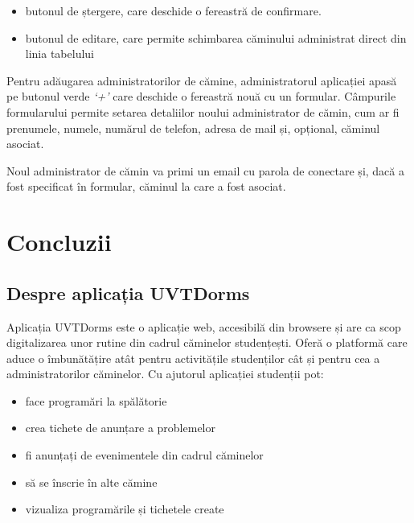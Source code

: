 \documentclass[12pt,a4paper]{report}
\theoremstyle{definition}
\theoremstyle{remark}
\begin{document}
\begin{itemize}
    \item butonul de ștergere, care deschide o fereastră de confirmare.
    \item butonul de editare, care permite schimbarea căminului administrat direct din linia tabelului
\end{itemize}


\par Pentru adăugarea administratorilor de cămine, administratorul aplicației apasă pe butonul verde \textit{`+'} care deschide o fereastră nouă cu un formular. Câmpurile formularului permite setarea detaliilor noului administrator de cămin, cum ar fi prenumele, numele, numărul de telefon, adresa de mail și, opțional, căminul asociat.

\par Noul administrator de cămin va primi un email cu parola de conectare și, dacă a fost specificat în formular, căminul la care a fost asociat.


\chapter{Concluzii}

\section{Despre aplicația UVTDorms}

\par Aplicația UVTDorms este o aplicație web, accesibilă din browsere și are ca scop digitalizarea unor rutine din cadrul căminelor studențești. Oferă o platformă care aduce o îmbunătățire atât pentru activitățile studenților cât și pentru cea a administratorilor căminelor. Cu ajutorul aplicației studenții pot:

\begin{itemize}
    \item face programări la spălătorie
    \item crea tichete de anunțare a problemelor
    \item fi anunțați de evenimentele din cadrul căminelor
    \item să se înscrie în alte cămine
    \item vizualiza programările și tichetele create
\end{itemize}
\end{document}
